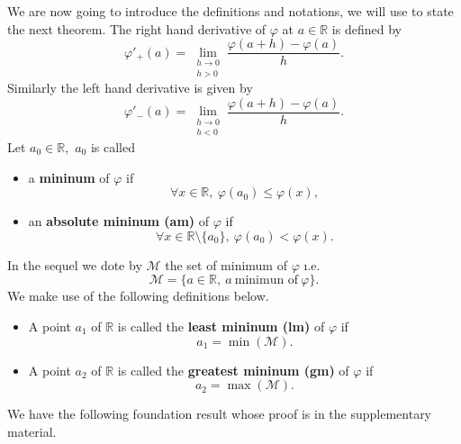\documentclass[
  11pt,
  a4paper,
]{article}
\newcommand\R{{\mathbb R}}
\begin{document}
We are now going to introduce the definitions and notations, we will use to state the next theorem.
The right hand derivative of $\varphi$ at $a\in \R$ is defined by
\[
\varphi'_+(a)=\lim_{\substack{h\to 0 \\ h>0}} \frac{\varphi(a+h)-\varphi(a)}{h}.
\]
Similarly the left hand derivative is given by
\[
\varphi'_-(a)=\lim_{\substack{h\to 0 \\ h<0}} \frac{\varphi(a+h)-\varphi(a)}{h}.
\]
Let $a_0\in\R,$ $a_0$ is called
\begin{itemize}
	\item  [--] a \textbf{mininum} of $\varphi$ if
	\[
	\forall x\in\R,\  \varphi(a_0)\leq \varphi(x),
	\]
	\item  [--] an \textbf{absolute mininum (am)} of $\varphi$ if
	\[
	\forall x\in\R\setminus\{a_0\},\  \varphi(a_0)< \varphi(x).
	\]        
\end{itemize}
In the sequel we dote by $\mathscr{M}$ the set of minimum of $\varphi$ \i.e.
\[
\mathscr{M}=\{a\in\R,\ a \ \text{minimun of} \ \varphi\}.  
\]
We make use of the following definitions below. 
\begin{itemize}
	\item  [--] A point $a_1$ of $\R$ is called the   \textbf{least mininum (lm)} of $\varphi$ if
	\[
	a_1=\min\left(\mathscr{M}\right).
	\]
	\item  [--] A point $a_2$ of $\R$ is called the   \textbf{greatest mininum (gm)} of $\varphi$ if
	\[
	a_2=\max\left(\mathscr{M}\right).
	\]
\end{itemize}
We have the following foundation  result whose proof is in the supplementary material.  
\end{document}
